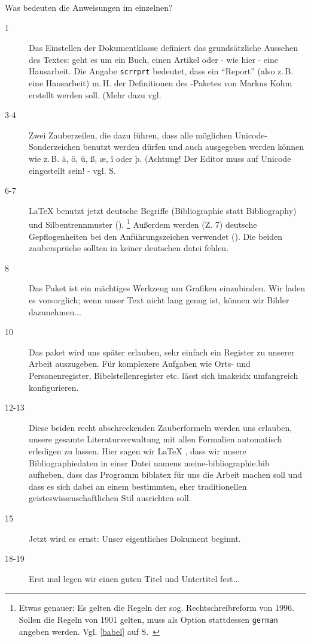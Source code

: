 Was bedeuten die Anweisungen im einzelnen?

\begin{description}
 \item[1] Das Einstellen der Dokumentklasse definiert das grundsätzliche Aussehen des 
 Textes: geht es um ein Buch, einen Artikel oder - wie hier - eine Hausarbeit. 
 Die Angabe \lstinline/scrrprt/ bedeutet, dass ein \enquote{Report} (also z.\,B. eine Hausarbeit)
 m.\,H. der Definitionen des \KOMAScript-Paketes von Markus Kohm erstellt werden soll.
 (Mehr dazu vgl. \pageref{komaskript}
 \item[3-4] Zwei Zauberzeilen, die dazu führen, dass alle möglichen Unicode-Sonderzeichen
 benutzt werden dürfen und auch ausgegeben werden können wie z.\,B. ä, ö, ü, ß, æ, ï oder þ.
 (Achtung! Der Editor muss auf Unicode eingestellt sein! - vgl. S.~\pageref{unicode}
 \item[6-7] \LaTeX{} benutzt jetzt deutsche Begriffe (Bibliographie statt Bibliography) und 
 Silbentrennmuster (). 
 \footnote{Etwas genauer: Es gelten die Regeln der sog. Rechtschreibreform von 1996.
 Sollen die Regeln von 1901 gelten, muss als Option stattdessen \lstinline/german/ angeben
 werden. Vgl. \ref{babel} auf S.~\pageref{babel}}
 Außerdem werden (Z. 7) deutsche Gepflogenheiten bei den Anführungszeichen
 verwendet (). 
 Die beiden zaubersprüche sollten in keiner deutschen datei fehlen.
 \item[8] Das Paket  ist ein mächtiges Werkzeug um Grafiken einzubinden.
 Wir laden es vorsorglich; wenn unser Text nicht lang genug ist, können wir Bilder dazunehmen...
 \item[10] Das paket  wird uns später erlauben, sehr einfach ein Register zu unserer
 Arbeit auszugeben.
 Für komplexere Aufgaben wie Orts- und Personenregister, Bibelstellenregister etc. lässt sich
 imakeidx umfangreich konfigurieren.
 \item[12-13] Diese beiden recht abschreckenden Zauberformeln werden uns erlauben, unsere
 gesamte Literaturverwaltung mit allen Formalien automatisch erledigen zu lassen.
 Hier sagen wir \LaTeX{} , dass wir unsere Bibliographiedaten in einer Datei namens 
 meine-bibliographie.bib aufheben, dass das Programm biblatex für uns die Arbeit machen soll
 und dass es sich dabei an einem bestimmten, eher traditionellen geisteswissenschaftlichen
 Stil ausrichten soll.
 \item[15] Jetzt wird es ernst: Unser eigentliches Dokument beginnt.
 \item[18-19] Erst mal legen wir einen guten Titel und Untertitel fest...

\end{description}
